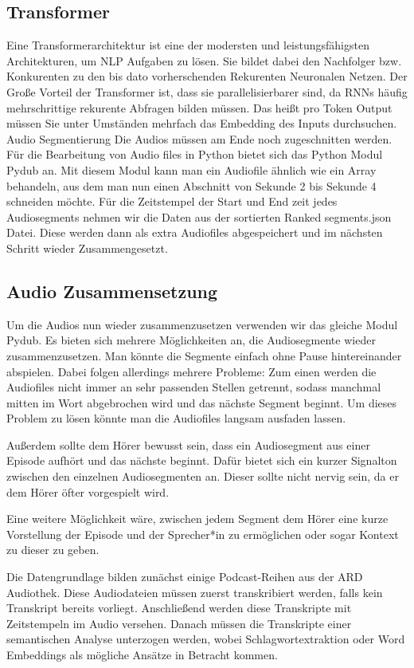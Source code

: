 \subsection{Transformer}


Eine Transformerarchitektur ist eine der modersten und leistungsfähigsten Architekturen, um NLP Aufgaben zu lösen. Sie bildet dabei den Nachfolger bzw. Konkurenten zu den bis dato vorherschenden Rekurenten Neuronalen Netzen. Der Große Vorteil der Transformer ist, dass sie parallelisierbarer sind, da RNNs häufig mehrschrittige rekurente Abfragen bilden müssen. Das heißt pro Token Output müssen Sie unter Umständen mehrfach das Embedding des Inputs durchsuchen. Audio Segmentierung Die Audios müssen am Ende noch zugeschnitten werden. 
Für die Bearbeitung von Audio files in Python bietet sich das Python Modul Pydub an. Mit diesem Modul kann man ein Audiofile ähnlich wie ein Array behandeln, aus dem man nun einen Abschnitt von Sekunde 2 bis Sekunde 4 schneiden möchte. 
Für die Zeitstempel der Start und End zeit jedes Audiosegments nehmen wir die Daten aus der sortierten Ranked segments.json Datei.
Diese werden dann als extra Audiofiles abgespeichert und im nächsten Schritt wieder Zusammengesetzt.

\subsection{Audio Zusammensetzung}


Um die Audios nun wieder zusammenzusetzen verwenden wir das gleiche Modul Pydub. Es bieten sich mehrere Möglichkeiten an, die Audiosegmente wieder zusammenzusetzen. Man könnte die Segmente einfach ohne Pause hintereinander abspielen. Dabei folgen allerdings mehrere Probleme: 
Zum einen werden die Audiofiles nicht immer an sehr passenden Stellen getrennt, sodass manchmal mitten im Wort abgebrochen wird und das nächste Segment beginnt. 
Um dieses Problem zu lösen könnte man die Audiofiles langsam ausfaden lassen.

Außerdem sollte dem Hörer bewusst sein, dass ein Audiosegment aus einer Episode aufhört und das nächste beginnt. Dafür bietet sich ein kurzer Signalton zwischen den einzelnen Audiosegmenten an. Dieser sollte nicht nervig sein, da er dem Hörer öfter vorgespielt wird. 

Eine weitere Möglichkeit wäre, zwischen jedem Segment dem Hörer eine kurze Vorstellung der Episode und der Sprecher*in zu ermöglichen oder sogar Kontext zu dieser zu geben. 


Die Datengrundlage bilden zunächst einige Podcast-Reihen aus der ARD Audiothek. Diese Audiodateien müssen zuerst transkribiert werden, falls kein Transkript bereits vorliegt. Anschließend werden diese Transkripte mit Zeitstempeln im Audio versehen. Danach müssen die Transkripte einer semantischen Analyse unterzogen werden, wobei Schlagwortextraktion oder Word Embeddings als mögliche Ansätze in Betracht kommen.

